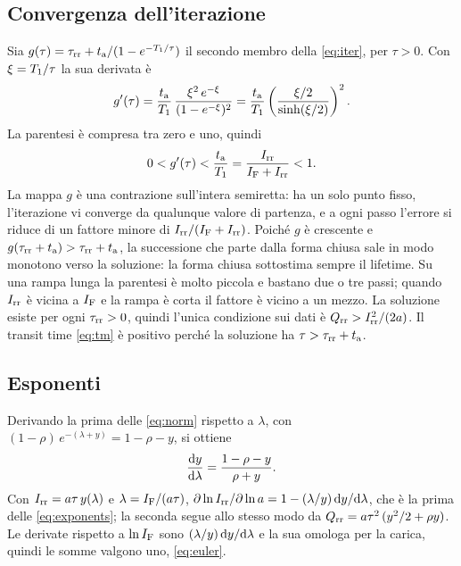 \documentclass[10pt,a4paper]{scrartcl}
\let\newcommand\pdvaluedefine
\newcommand{\IF}{I_\mathrm{F}}
\newcommand{\Irr}{I_\mathrm{rr}}
\newcommand{\Qrr}{Q_\mathrm{rr}}
\newcommand{\ta}{t_\mathrm{a}}
\newcommand{\taurr}{\tau_\mathrm{rr}}
\newcommand{\Tone}{T_1}
\newcommand{\diff}{\mathrm{d}}
\begin{document}
\subsection{Convergenza dell'iterazione}
\label{app:contraction}
Sia $g(\tau) = \taurr + \ta/(1-e^{-\Tone/\tau})$ il secondo membro della \eqref{eq:iter}, per $\tau > 0$. Con $\xi = \Tone/\tau$ la sua derivata è
\begin{equation}
g'(\tau) = \frac{\ta}{\Tone}\,\frac{\xi^2\,e^{-\xi}}{(1-e^{-\xi})^2} = \frac{\ta}{\Tone}\left(\frac{\xi/2}{\sinh(\xi/2)}\right)^{2} .
\end{equation}
La parentesi è compresa tra zero e uno, quindi
\begin{equation}
0 < g'(\tau) < \frac{\ta}{\Tone} = \frac{\Irr}{\IF+\Irr} < 1 .
\end{equation}
La mappa $g$ è una contrazione sull'intera semiretta: ha un solo punto fisso, l'iterazione vi converge da qualunque valore di partenza, e a ogni passo l'errore si riduce di un fattore minore di $\Irr/(\IF+\Irr)$. Poiché $g$ è crescente e $g(\taurr+\ta) > \taurr+\ta$, la successione che parte dalla forma chiusa sale in modo monotono verso la soluzione: la forma chiusa sottostima sempre il lifetime. Su una rampa lunga la parentesi è molto piccola e bastano due o tre passi; quando $\Irr$ è vicina a $\IF$ e la rampa è corta il fattore è vicino a un mezzo. La soluzione esiste per ogni $\taurr > 0$, quindi l'unica condizione sui dati è $\Qrr > \Irr^2/(2a)$. Il transit time \eqref{eq:tm} è positivo perché la soluzione ha $\tau > \taurr + \ta$.

\subsection{Esponenti}
\label{app:exponents}
Derivando la prima delle \eqref{eq:norm} rispetto a $\lambda$, con $(1-\rho)\,e^{-(\lambda+y)} = 1-\rho-y$, si ottiene
\begin{equation}
\frac{\diff y}{\diff\lambda} = \frac{1-\rho-y}{\rho+y} .
\end{equation}
Con $\Irr = a\tau\,y(\lambda)$ e $\lambda = \IF/(a\tau)$, $\partial\ln\Irr/\partial\ln a = 1 - (\lambda/y)\,\diff y/\diff\lambda$, che è la prima delle \eqref{eq:exponents}; la seconda segue allo stesso modo da $\Qrr = a\tau^2\,(y^2/2+\rho y)$. Le derivate rispetto a $\ln\IF$ sono $(\lambda/y)\,\diff y/\diff\lambda$ e la sua omologa per la carica, quindi le somme valgono uno, \eqref{eq:euler}.
\end{document}
